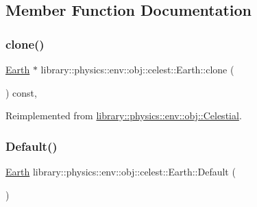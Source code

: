 \subsection{Member Function Documentation}
\mbox{\label{classlibrary_1_1physics_1_1env_1_1obj_1_1celest_1_1_earth_aca39bec00a2046a3fcef9bf22be52428}} 
\subsubsection{\texorpdfstring{clone()}{clone()}}
{\footnotesize\ttfamily \hyperlink{classlibrary_1_1physics_1_1env_1_1obj_1_1celest_1_1_earth}{Earth} $\ast$ library\+::physics\+::env\+::obj\+::celest\+::\+Earth\+::clone (\begin{DoxyParamCaption}{ }\end{DoxyParamCaption}) const\hspace{0.3cm}{\ttfamily [override]}, {\ttfamily [virtual]}}



Reimplemented from \hyperlink{classlibrary_1_1physics_1_1env_1_1obj_1_1_celestial_aaf8aa41a0ff9336eba62c07e3c27f82d}{library\+::physics\+::env\+::obj\+::\+Celestial}.

\mbox{\label{classlibrary_1_1physics_1_1env_1_1obj_1_1celest_1_1_earth_a01853b8ce201525ee6cec2f00e1580d4}} 
\subsubsection{\texorpdfstring{Default()}{Default()}}
{\footnotesize\ttfamily \hyperlink{classlibrary_1_1physics_1_1env_1_1obj_1_1celest_1_1_earth}{Earth} library\+::physics\+::env\+::obj\+::celest\+::\+Earth\+::\+Default (\begin{DoxyParamCaption}{ }\end{DoxyParamCaption})\hspace{0.3cm}{\ttfamily [static]}}



